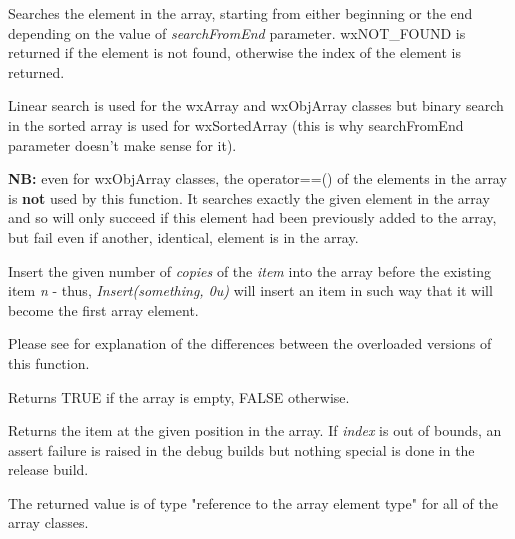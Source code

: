 Searches the element in the array, starting from either beginning or the end
depending on the value of {\it searchFromEnd} parameter. wxNOT\_FOUND is
returned if the element is not found, otherwise the index of the element is
returned.

Linear search is used for the wxArray and wxObjArray classes but binary search
in the sorted array is used for wxSortedArray (this is why searchFromEnd
parameter doesn't make sense for it).

{\bf NB:} even for wxObjArray classes, the operator==() of the elements in the
array is {\bf not} used by this function. It searches exactly the given
element in the array and so will only succeed if this element had been
previously added to the array, but fail even if another, identical, element is
in the array.

\label{wxarrayinsert}




Insert the given number of {\it copies} of the {\it item} into the array before
the existing item {\it n} - thus, {\it Insert(something, 0u)} will insert an
item in such way that it will become the first array element.

Please see  for explanation of the differences
between the overloaded versions of this function.

\label{wxarrayisempty}


Returns TRUE if the array is empty, FALSE otherwise.

\label{wxarrayitem}


Returns the item at the given position in the array. If {\it index} is out of
bounds, an assert failure is raised in the debug builds but nothing special is
done in the release build.

The returned value is of type "reference to the array element type" for all of
the array classes.

\label{wxarraylast}

